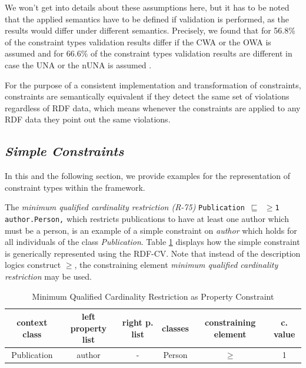 \documentclass[a4paper,fontsize=11pt]{scrartcl}
\newcommand{\ms}[1]{\texttt{#1}}
\begin{document}
We won't get into details about these assumptions here, but it has to be noted that the applied semantics have to be defined if validation is performed, as the results would differ under different semantics. Precisely, we found that for 56.8\% of the constraint types validation results differ if the CWA or the OWA is assumed 
and for 66.6\% of the constraint types validation results are different in case the UNA or the nUNA is assumed \cite{BoschNolleAcarEckert2015}.

For the purpose of a consistent implementation and transformation of constraints, constraints are semantically equivalent  
if they detect the same set of violations regardless of RDF data, 
which means whenever the constraints are applied to any RDF data they point out the same violations.


\subsection{\emph{Simple Constraints}}
In this and the following section, we provide examples for the representation of constraint types within the framework.

The \emph{minimum qualified cardinality restriction (R-75)} {\small\ms{Publication $\sqsubseteq$ $\geq$1 author.Person,}}
which restricts publications to have at least one author which must be a person,
is an example of a simple constraint on \emph{author}
which holds for all individuals of the class \emph{Publication}.
Table \ref{tab:property-constraint-cardinality-restriction} displays how the simple constraint is generically represented using the RDF-CV. Note that instead of the description logics construct $\geq$, the constraining element \emph{minimum qualified cardinality restriction} may be used.

\begin{table}[H]
  \scriptsize
  \sffamily
  \vspace{0cm}
	\caption{Minimum Qualified Cardinality Restriction as Property Constraint}
	\label{tab:property-constraint-cardinality-restriction}
	\centering
		\begin{tabular}{c|c|c|c|c|c}
      \textbf{context class} & \textbf{left property list} & \textbf{right p. list} & \textbf{classes} & \textbf{constraining element} & \textbf{c. value} \\
      \hline
      Publication & author & - & Person & $\geq$ & 1 \\
		\end{tabular}
\end{table}
\end{document}
